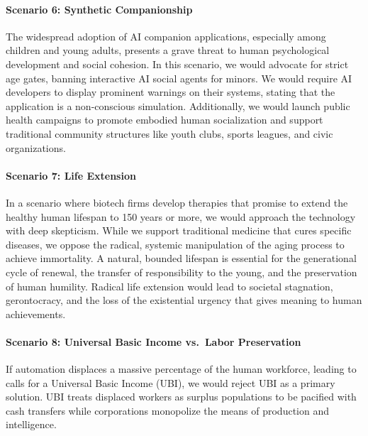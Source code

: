 \paragraph{Scenario 6: Synthetic
Companionship}\label{scenario-6-synthetic-companionship}

The widespread adoption of AI companion applications, especially among
children and young adults, presents a grave threat to human
psychological development and social cohesion. In this scenario, we
would advocate for strict age gates, banning interactive AI social
agents for minors. We would require AI developers to display prominent
warnings on their systems, stating that the application is a
non-conscious simulation. Additionally, we would launch public health
campaigns to promote embodied human socialization and support
traditional community structures like youth clubs, sports leagues, and
civic organizations.

\paragraph{Scenario 7: Life Extension}\label{scenario-7-life-extension}

In a scenario where biotech firms develop therapies that promise to
extend the healthy human lifespan to 150 years or more, we would
approach the technology with deep skepticism. While we support
traditional medicine that cures specific diseases, we oppose the
radical, systemic manipulation of the aging process to achieve
immortality. A natural, bounded lifespan is essential for the
generational cycle of renewal, the transfer of responsibility to the
young, and the preservation of human humility. Radical life extension
would lead to societal stagnation, gerontocracy, and the loss of the
existential urgency that gives meaning to human achievements.

\paragraph{Scenario 8: Universal Basic Income vs.~Labor
Preservation}\label{scenario-8-universal-basic-income-vs.-labor-preservation}

If automation displaces a massive percentage of the human workforce,
leading to calls for a Universal Basic Income (UBI), we would reject UBI
as a primary solution. UBI treats displaced workers as surplus
populations to be pacified with cash transfers while corporations
monopolize the means of production and intelligence.

